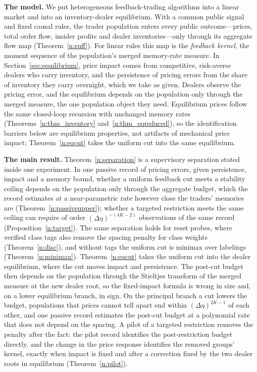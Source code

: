 \documentclass[11pt,letterpaper]{article}
\theoremstyle{definition}
\begin{document}
\textbf{The model.} We put heterogeneous feedback-trading algorithms into a linear market and into an inventory-dealer equilibrium. With a common public signal and fixed causal rules, the trader population enters every public outcome---prices, total order flow, insider profits and dealer inventories---only through its aggregate flow map (Theorem~\ref{n:suff}). For linear rules this map is the \emph{feedback kernel}, the moment sequence of the population's merged memory-rate measure. In Section~\ref{sec:equilibrium}, price impact comes from competitive, risk-averse dealers who carry inventory, and the persistence of pricing errors from the share of inventory they carry overnight, which we take as given. Dealers observe the pricing error, and the equilibrium depends on the population only through the merged measure, the one population object they need. Equilibrium prices follow the same closed-loop recursion with unchanged memory rates (Theorems~\ref{n:thm_inventory} and~\ref{n:thm_eqreduced}), so the identification barriers below are equilibrium properties, not artifacts of mechanical price impact; Theorem~\ref{n:eqcut} takes the uniform cut into the same equilibrium.

\textbf{The main result.} Theorem~\ref{n:separation} is a supervisory separation stated inside one experiment. In one passive record of pricing errors, given persistence, impact and a memory bound, whether a uniform feedback cut meets a stability ceiling depends on the population only through the aggregate budget, which the record estimates at a near-parametric rate however close the traders' memories are (Theorem~\ref{n:passiveupper}); whether a targeted restriction meets the same ceiling can require of order $(\Delta\eta)^{-(4K-2)}$ observations of the same record (Proposition~\ref{n:target}). The same separation holds for reset probes, where verified class tags also remove the spacing penalty for class weights (Theorem~\ref{n:disc}), and without tags the uniform cut is minimax over labelings (Theorem~\ref{n:minimax}). Theorem~\ref{n:eqcut} takes the uniform cut into the dealer equilibrium, where the cut moves impact and persistence. The post-cut budget then depends on the population through the Stieltjes transform of the merged measure at the new dealer root, so the fixed-impact formula is wrong in size and, on a lower equilibrium branch, in sign. On the principal branch a cut lowers the budget, populations that prices cannot tell apart end within $(\Delta\eta)^{2K-1}$ of each other, and one passive record estimates the post-cut budget at a polynomial rate that does not depend on the spacing. A pilot of a targeted restriction removes the penalty after the fact: the pilot record identifies the post-restriction budget directly, and the change in the price response identifies the removed groups' kernel, exactly when impact is fixed and after a correction fixed by the two dealer roots in equilibrium (Theorem~\ref{n:pilot}).
\end{document}
